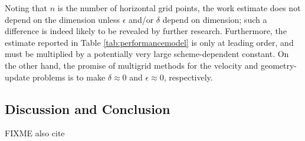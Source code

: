 \documentclass[twocolumn,letterpaper]{igs}
\newcommand\eps{\epsilon}
\begin{document}
Noting that $n$ is the number of horizontal grid points, the work estimate does not depend on the dimension unless $\eps$ and/or $\delta$ depend on dimension; such a difference is indeed likely to be revealed by further research.  Furthermore, the estimate reported in Table \ref{tab:performancemodel} is only at leading order, and must be multiplied by a potentially very large scheme-dependent constant.  On the other hand, the promise of multigrid methods for the velocity and geometry-update problems is to make $\delta \approx 0$ and $\eps \approx 0$, respectively.

\subsection{Discussion and Conclusion}

FIXME also cite \citep{LofgrenAhlkronaHelanow2021}




\end{document}
